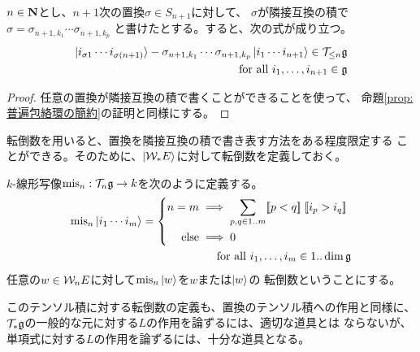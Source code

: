 {	\begin{proposition}[普遍包絡環の簡約その二]
	\label{prop:普遍包絡環の簡約その二} %
		$n\in\mathbf{N}$とし、$n+1$次の置換$\sigma\in S_{n+1}$に対して、
		$\sigma$が隣接互換の積で$\sigma=\sigma_{n+1,k_1}\cdots\sigma_{n+1,k_p}$
		と書けたとする。すると、次の式が成り立つ。
		\begin{equation*}\begin{split}
			\mathinner{|{i_{\sigma1}\cdots i_{\sigma(n+1)}}\rangle}
			- \sigma_{n+1,k_1}\cdots\sigma_{n+1,k_p}\mathinner{|{i_1\cdots i_{n+1}}\rangle}
			\in {\ensuremath{{\mathcal{T}}}}_{\le n}{\mathfrak{g}} \\
			\quad\text{for all } i_1,\dots,i_{n+1}\in {\mathfrak{g}}
		\end{split}\end{equation*}
	\end{proposition} %
	\begin{proof} 任意の置換が隣接互換の積で書くことができることを使って、
	命題\ref{prop:普遍包絡環の簡約}の証明と同様にする。
	\end{proof}

	転倒数を用いると、置換を隣接互換の積で書き表す方法をある程度限定する
	ことができる。そのために、$\mathinner{|{{\ensuremath{{\mathcal{W}}}}_*E}\rangle}$に対して転倒数を定義しておく。

	\begin{definition}[転倒数その二]\label{def:転倒数その二} %
		$k$-線形写像${\operatorname{mis}}_n:{{\mathcal{T}}}_n{\mathfrak{g}}\to k$を次のように定義する。
		\begin{equation*}\begin{split}
			{\ensuremath{\operatorname{mis}}}_n\mathinner{|{i_1\cdots i_m}\rangle}
			= \left\{\begin{split}
				n = m &\implies \sum_{p,q\in 1..m} [\![p<q]\!]\;[\![i_p>i_q]\!]\; \\
				\text{else} &\implies 0 \\
			\end{split}\right. \\
			\quad\text{for all } i_1,\dots,i_m\in 1..\dim{\mathfrak{g}}
		\end{split}\end{equation*}
		任意の$w\in{\ensuremath{{\mathcal{W}}}}_nE$に対して${\operatorname{mis}}_n\mathinner{|{w}\rangle}$を$w$または$\mathinner{|{w}\rangle}$の
		転倒数ということにする。
	\end{definition} %

	このテンソル積に対する転倒数の定義も、置換のテンソル積への作用と同様に、
	${{\mathcal{T}}}_*{\mathfrak{g}}$の一般的な元に対する$L$の作用を論ずるには、適切な道具とは
	ならないが、単項式に対する$L$の作用を論ずるには、十分な道具となる。

}
